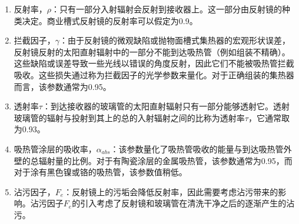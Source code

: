 \begin{enumerate}[label=(\arabic*)]
  \item 反射率，$\rho$：只有一部分入射辐射会反射到接收器上。这一部分由反射镜的种类决定。商业槽式反射镜的反射率可以假定为0.9。
  \item 拦截因子，$\gamma$：由于反射镜的微观缺陷或抛物面槽式集热器的宏观形状误差，反射镜反射的太阳直射辐射中的一部分不能到达吸热管（例如组装不精确）。这些缺陷或误差导致一些光线以错误的角度反射，因此它们不能被吸热管拦截吸收。这些损失通过称为拦截因子的光学参数来量化。对于正确组装的集热器而言，该参数通常为0.95。
  \item 透射率$\tau$：到达接收器的玻璃管的太阳直射辐射只有一部分能够透射它。透射玻璃管的辐射与投射到其上的总的入射辐射之间的比称为透射率$\tau$，它通常取为0.93。
  \item 吸热管涂层的吸收率，$\alpha_{abs}$：该参数量化了吸热管吸收的能量与到达吸热管外壁的总辐射量的比例。对于有陶瓷涂层的金属吸热管，该参数通常为0.95，而对于涂有黑色镍或铬的吸热管，该参数值稍低。
  \item 沾污因子，$F_e$：反射镜上的污垢会降低反射率，因此需要考虑沾污带来的影响。沾污因子$F_e$的引入考虑了反射镜和玻璃管在清洗干净之后的逐渐产生的沾污。
\end{enumerate}

